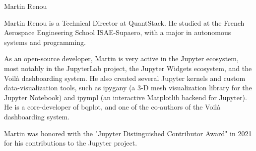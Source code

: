 \begin{participant}[type=R,PM=0,gender=male]{Martin Renou}

  Martin Renou is a Technical Director at QuantStack. He studied at the French Aerospace Engineering School ISAE-Supaero, with a major in autonomous systems and programming.

  As an open-source developer, Martin is very active in the Jupyter ecosystem, most notably in the JupyterLab project, the Jupyter Widgets ecosystem, and the Voilà dashboarding system. He also created several Jupyter kernels and custom data-visualization tools, such as ipygany (a 3-D mesh visualization library for the Jupyter Notebook) and ipympl (an interactive Matplotlib backend for Jupyter). He is a core-developer of bqplot, and one of the co-authors of the Voilà dashboarding system.

  Martin was honored with the "Jupyter Distinguished Contributor Award" in 2021 for his contributions to the Jupyter project.
\end{participant}

